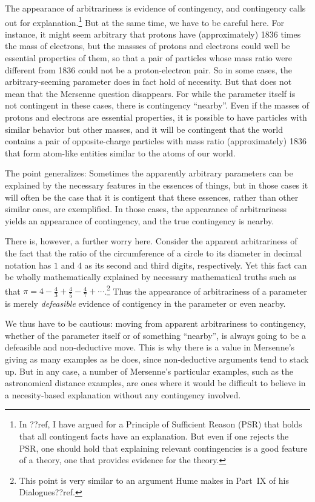 The appearance of arbitrariness is evidence of contingency, and contingency calls out for explanation.\footnote{In ??ref, I have
argued for a Principle of Sufficient Reason (PSR) that holds that all contingent facts have an explanation. But even if one rejects
the PSR, one should hold that explaining relevant contingencies is a good feature of a theory, one that provides evidence for the
theory.} But at the 
same time, we have to be careful here. For instance,
it might seem arbitrary that protons have (approximately) 1836 times the mass of electrons, but the massses of protons and
electrons could well be essential properties of them, so that a pair of particles whose mass ratio were different from 1836 could 
not be a proton-electron pair.  So in some cases, the arbitrary-seeming parameter does in fact hold of necessity. But that does not
mean that the Mersenne question disappears. For while the parameter itself is not contingent in these cases, there is contingency
``nearby''. Even if the masses of protons and electrons are essential properties, it is possible to have particles with similar
behavior but other masses, and it will be contingent that the world contains a pair of opposite-charge particles with mass ratio 
(approximately) 1836 that form atom-like entities similar to the atoms of our world. 

The point generalizes: Sometimes the apparently arbitrary parameters can be explained by the necessary features in the essences of
things, but in those cases it will often be the case that it is contigent that these essences, rather than other similar ones, are
exemplified. In those cases, the appearance of arbitrariness yields an appearance of contingency, and the true contingency is 
nearby.

There is, however, a further worry here. Consider the apparent arbitrariness of the fact that the ratio of the circumference of
a circle to its diameter in decimal notation has $1$ and $4$ as its second and third digits, respectively. Yet this fact can 
be wholly mathematically explained by necessary mathematical truths such as that $\pi=4-\frac43+\frac45-\frac47+\cdots$.\footnote{This 
point is very similar to an argument Hume makes in Part~IX of his Dialogues??ref.} Thus the appearance of arbitrariness of a parameter is merely
\textit{defeasible} evidence of contigency in the parameter or even nearby. 

We thus have to be cautious: moving from apparent arbitrariness to contingency, whether of the parameter itself or of something ``nearby'', is
always going to be a defeasible and non-deductive move. This is why there is a value in Mersenne's giving as many examples as he does, since 
non-deductive arguments tend to stack up. But in any case, a number of Mersenne's particular examples, such as the astronomical distance examples, 
are ones where it would be difficult to believe in a necesity-based explanation without any contingency involved. 

